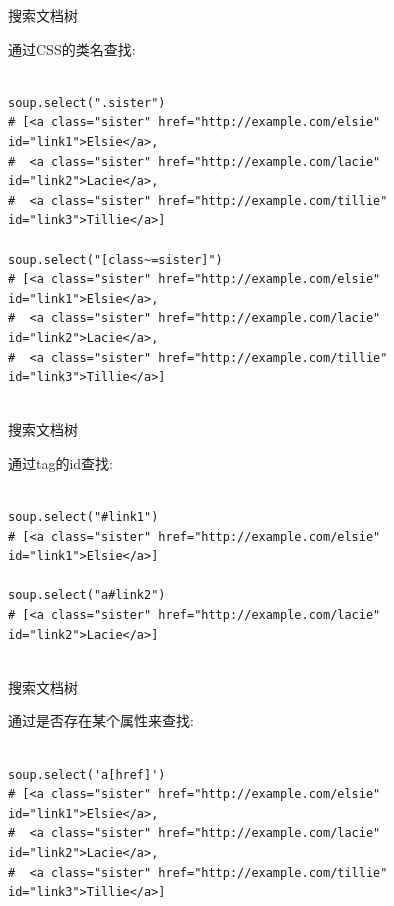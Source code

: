 \documentclass{beamer}
\begin{document}
\begin{frame}[t,fragile]{搜索文档树}

通过CSS的类名查找:

\begin{verbatim}

soup.select(".sister")
# [<a class="sister" href="http://example.com/elsie" id="link1">Elsie</a>,
#  <a class="sister" href="http://example.com/lacie" id="link2">Lacie</a>,
#  <a class="sister" href="http://example.com/tillie" id="link3">Tillie</a>]

soup.select("[class~=sister]")
# [<a class="sister" href="http://example.com/elsie" id="link1">Elsie</a>,
#  <a class="sister" href="http://example.com/lacie" id="link2">Lacie</a>,
#  <a class="sister" href="http://example.com/tillie" id="link3">Tillie</a>]


\end{verbatim}


\end{frame}


\begin{frame}[t,fragile]{搜索文档树}

通过tag的id查找:

\begin{verbatim}

soup.select("#link1")
# [<a class="sister" href="http://example.com/elsie" id="link1">Elsie</a>]

soup.select("a#link2")
# [<a class="sister" href="http://example.com/lacie" id="link2">Lacie</a>]


\end{verbatim}


\end{frame}



\begin{frame}[t,fragile]{搜索文档树}

通过是否存在某个属性来查找:

\begin{verbatim}

soup.select('a[href]')
# [<a class="sister" href="http://example.com/elsie" id="link1">Elsie</a>,
#  <a class="sister" href="http://example.com/lacie" id="link2">Lacie</a>,
#  <a class="sister" href="http://example.com/tillie" id="link3">Tillie</a>]


\end{verbatim}


\end{frame}
\end{document}
